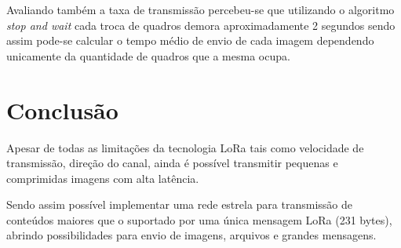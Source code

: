 \documentclass[
article,			%
12pt,				%
oneside,			%
a4paper,			%
english,			%
brazil,				%
sumario=tradicional
]{abntex2}
\begin{document}
Avaliando também a taxa de transmissão percebeu-se que utilizando o algoritmo \textit{stop and wait} cada troca de quadros demora aproximadamente 2 segundos sendo assim pode-se calcular o tempo médio de envio de cada imagem dependendo unicamente da quantidade de quadros que a mesma ocupa.

\section{Conclusão}\label{Conclusão}
Apesar de todas as limitações da tecnologia LoRa tais como velocidade de transmissão, direção do canal, ainda é possível transmitir pequenas e comprimidas imagens com alta latência.

Sendo assim possível implementar uma rede estrela para transmissão de conteúdos maiores que o suportado por uma única mensagem LoRa (231 bytes), abrindo possibilidades para envio de imagens, arquivos e grandes mensagens.


\postextual


\end{document}
